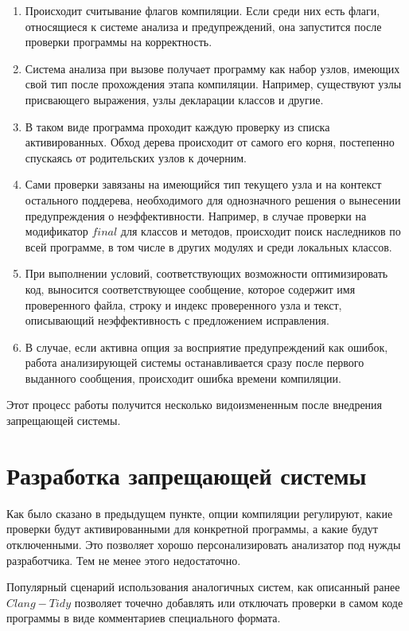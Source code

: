 \documentclass{mipt-thesis-bs}
\begin{document}
\begin{enumerate}
    \item Происходит считывание флагов компиляции. Если среди них есть флаги, относящиеся к 
    системе анализа и предупреждений, она запустится после проверки программы на корректность.
    \item Система анализа при вызове получает программу как набор узлов, имеющих свой тип после 
    прохождения этапа компиляции. Например, существуют узлы присвающего выражения, узлы 
    декларации классов и другие.
    \item В таком виде программа проходит каждую проверку из списка активированных. Обход 
    дерева происходит от самого его корня, постепенно спускаясь от родительских узлов к дочерним.
    \item Сами проверки завязаны на имеющийся тип текущего узла и на контекст остального 
    поддерева, необходимого для однозначного решения о вынесении предупреждения о неэффективности.
    Например, в случае проверки на модификатор $final$ для классов и методов, происходит поиск 
    наследников по всей программе, в том числе в других модулях и среди локальных классов.
    \item При выполнении условий, соответствующих возможности оптимизировать код, выносится 
    соответствующее сообщение, которое содержит имя проверенного файла, строку и индекс 
    проверенного узла и текст, описывающий неэффективность с предложением исправления.
    \item В случае, если активна опция за восприятие предупреждений как ошибок, работа 
    анализирующей системы останавливается сразу после первого выданного сообщения, происходит 
    ошибка времени компиляции.
\end{enumerate}

Этот процесс работы получится несколько видоизмененным после внедрения запрещающей системы.

\section{Разработка запрещающей системы}

Как было сказано в предыдущем пункте, опции компиляции регулируют, какие проверки будут 
активированными для конкретной программы, а какие будут отключенными. Это позволяет хорошо 
персонализировать анализатор под нужды разработчика. Тем не менее этого недостаточно.

Популярный сценарий использования аналогичных систем, как описанный ранее $Clang-Tidy$ 
позволяет точечно добавлять или отключать проверки в самом коде программы в виде 
комментариев специального формата.
\end{document}
